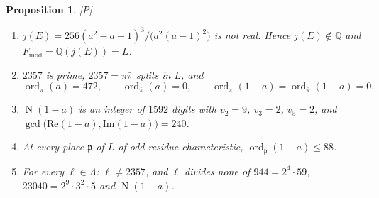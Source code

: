 \documentclass[11pt,a4paper]{article}
\newcommand{\Q}{\mathbb{Q}}
\newcommand{\Fmod}{F_{\mathrm{mod}}}
\newcommand{\ord}{\operatorname{ord}}
\newcommand{\Nm}{\operatorname{N}}
\newcommand{\tP}{\textup{[P]}}
\theoremstyle{plain}
\newtheorem{proposition}[theorem]{Proposition}
\theoremstyle{definition}
\begin{document}
\begin{proposition}\label{p:arith}
\tP{}
\begin{enumerate}[label=(\alph*)]
\item $j(E)=256(a^2-a+1)^3/\bigl(a^2(a-1)^2\bigr)$ is not real. Hence $j(E)\notin\Q$ and $\Fmod=\Q(j(E))=L$.
\item $2357$ is prime, $2357=\pi\bar\pi$ splits in $L$, and
 \[
  \ord_\pi(a)=472,\qquad\ord_{\bar\pi}(a)=0,\qquad\ord_\pi(1-a)=\ord_{\bar\pi}(1-a)=0.
 \]
\item $\Nm(1-a)$ is an integer of $1592$ digits with $v_2=9$, $v_3=2$, $v_5=2$, and
 $\gcd\bigl(\mathrm{Re}(1-a),\mathrm{Im}(1-a)\bigr)=240$.
\item At every place $\mathfrak p$ of $L$ of odd residue characteristic, $\ord_{\mathfrak p}(1-a)\le88$.
\item For every $\ell\in\Lambda$: $\ell\ne2357$, and $\ell$ divides none of $944=2^4\cdot59$,
 $23040=2^9\cdot3^2\cdot5$ and $\Nm(1-a)$.
\end{enumerate}
\end{proposition}
\end{document}
